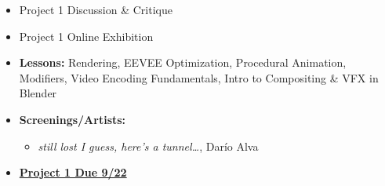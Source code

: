 \def\dMon{2/15}%
\def\dTues{2/16}%
\def\dWed{2/17}%
\def\dThur{2/18}%
\placeDate

\def\tues{9/22}%
\def\thur{9/24}%
% 
\begin{itemize}[noitemsep,topsep=0pt,leftmargin=*]
    \item Project 1 Discussion \& Critique
    \item Project 1 Online Exhibition
\end{itemize}
\vspace{1em}
\begin{itemize}[noitemsep,topsep=0pt,leftmargin=*]
    \item \textbf{Lessons:} Rendering, EEVEE Optimization, Procedural Animation, Modifiers, Video Encoding Fundamentals, Intro to Compositing \& VFX in Blender
    \item \textbf{Screenings/Artists:}
    \begin{itemize}
        \item \emph{still lost I guess, here’s a tunnel\dots}, Darío Alva
        \end{itemize}
    \item \textcolor{defaultColor}{\ul{\textbf{Project 1 Due \tues}}}
\end{itemize}